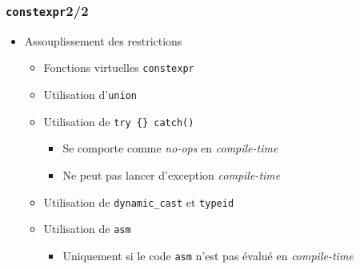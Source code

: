 \documentclass[C++.tex]{subfiles}
\begin{document}
\begin{frame}[fragile]
	\frametitle{\lstinline|constexpr|\titlehfill{}2/2}
	\begin{itemize}
		\item Assouplissement des restrictions
		\begin{itemize}
			\item Fonctions virtuelles \lstinline|constexpr|
			\item Utilisation d'\lstinline|union|
			\item Utilisation de \lstinline|try {} catch()|
			\begin{itemize}
				\item Se comporte comme \textit{no-ops} en \textit{compile-time}
				\item Ne peut pas lancer d'exception \textit{compile-time}
			\end{itemize}
			\item Utilisation de \lstinline|dynamic_cast| et \lstinline|typeid|
			\item Utilisation de \lstinline|asm|
			\begin{itemize}
				\item Uniquement si le code \lstinline|asm| n'est pas évalué en \textit{compile-time}


			\end{itemize}
		\end{itemize}
	\end{itemize}
\end{frame}
\end{document}
